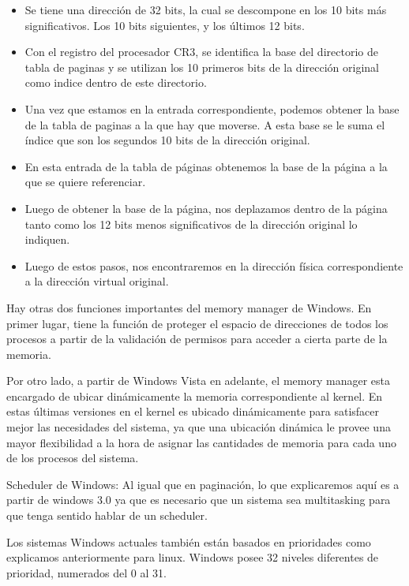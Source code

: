 \documentclass[a4paper, 12pt]{article}
\begin{document}
\begin{itemize}
\item Se tiene una direcci\'on de 32 bits, la cual se descompone en los 10 bits m\'as significativos. Los 10 bits siguientes, y los \'ultimos 12 bits.
\item Con el registro del procesador CR3, se identifica la base del directorio de tabla de paginas y se utilizan los 10 primeros bits de la direcci\'on original como indice dentro de este directorio.
\item Una vez que estamos en la entrada correspondiente, podemos obtener la base de la tabla de paginas a la que hay que moverse. A esta base se le suma el \'indice que son los segundos 10 bits de la direcci\'on original.
\item En esta entrada de la tabla de p\'aginas obtenemos la base de la p\'agina a la que se quiere referenciar. 
\item Luego de obtener la base de la p\'agina, nos deplazamos dentro de la p\'agina tanto como los 12 bits menos significativos de la direcci\'on original lo indiquen.
\item Luego de estos pasos, nos encontraremos en la direcci\'on f\'isica correspondiente a la direcci\'on virtual original.
\end{itemize}


Hay otras dos funciones importantes del memory manager de Windows. En primer lugar, tiene la funci\'on de proteger el espacio de direcciones de todos los procesos a partir de la validaci\'on de permisos para acceder a cierta parte de la memoria.

Por otro lado, a partir de Windows Vista en adelante, el memory manager esta encargado de ubicar din\'amicamente la memoria correspondiente al kernel. En estas \'ultimas versiones en el kernel es ubicado din\'amicamente para satisfacer mejor las necesidades del sistema, ya que una ubicaci\'on din\'amica le provee una mayor flexibilidad a la hora de asignar las cantidades de memoria para cada uno de los procesos del sistema.



\bigskip


Scheduler de Windows: Al igual que en paginaci\'on, lo que explicaremos aqu\'i es a partir de windows 3.0 ya que es necesario que un sistema sea multitasking para que tenga sentido hablar de un scheduler.

Los sistemas Windows actuales tambi\'en est\'an basados en prioridades como explicamos anteriormente para linux. Windows posee 32 niveles diferentes de prioridad, numerados del 0 al 31.
\end{document}
